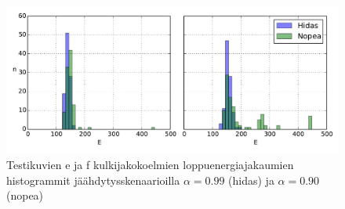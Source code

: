 \begin{figure}[htpb]
    \centering
    \includegraphics[width=1.0\linewidth]{figures/set3_histo_compare_2_099_090.pdf}
    \caption{Testikuvien e ja f kulkijakokoelmien loppuenergiajakaumien histogrammit jäähdytysskenaarioilla $\alpha = 0.99$ (hidas) ja $\alpha = 0.90$ (nopea)
        \label{fig:set3_histo_compare_2_099_090}
    }
\end{figure}

%
%
%
%
%


